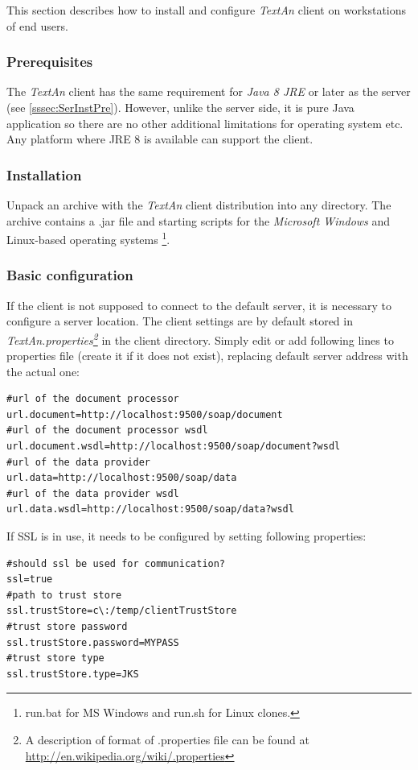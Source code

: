 \documentclass[12pt,a4paper]{report}
\newcommand{\textan}{\emph{TextAn}}
\begin{document}
This section describes how to install and configure \textan{} client on
workstations of end users.

\subsubsection{Prerequisites}

The \textan{} client has the same requirement for \emph{Java 8 JRE} or later
as the server (see \ref{sssec:SerInstPre}). However, unlike the server side,
it is pure Java application so there are no other additional limitations for
operating system etc. Any platform where JRE 8 is available can support the
client.

\subsubsection{Installation}

Unpack an archive with the \textan{} client distribution into any directory. 
The archive contains a .jar file and starting scripts for the
\emph{Microsoft Windows} and Linux-based operating systems%
\footnote{run.bat for MS Windows and run.sh for Linux clones.\label{runscript_note}}.

\subsubsection{Basic configuration}
\label{sssec:BasicConf}

If the client is not supposed to connect to the default server, it is necessary
to configure a server location. The client settings are by default stored in
\emph{TextAn.properties\footnote{A description of format of .properties file can
be found at \url{http://en.wikipedia.org/wiki/.properties}}}
in the client directory. Simply edit or add following lines to properties file
(create it if it does not exist), replacing default server address with the
actual one:
\begin{lstlisting}[frame=single,language=properties]
#url of the document processor
url.document=http://localhost:9500/soap/document
#url of the document processor wsdl
url.document.wsdl=http://localhost:9500/soap/document?wsdl
#url of the data provider
url.data=http://localhost:9500/soap/data
#url of the data provider wsdl
url.data.wsdl=http://localhost:9500/soap/data?wsdl
\end{lstlisting}

If SSL is in use, it needs to be configured by setting following properties:
\begin{lstlisting}[frame=single,language=properties]
#should ssl be used for communication?
ssl=true
#path to trust store
ssl.trustStore=c\:/temp/clientTrustStore
#trust store password
ssl.trustStore.password=MYPASS
#trust store type
ssl.trustStore.type=JKS
\end{lstlisting}
\end{document}
